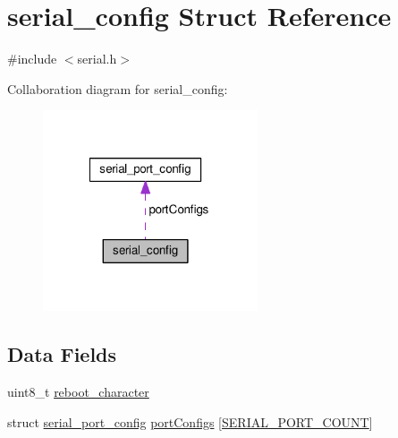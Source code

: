 \hypertarget{structserial__config}{\section{serial\+\_\+config Struct Reference}
\label{structserial__config}
}


{\ttfamily \#include $<$serial.\+h$>$}



Collaboration diagram for serial\+\_\+config\+:\nopagebreak
\begin{figure}[H]
\begin{center}
\leavevmode
\includegraphics[width=180pt]{structserial__config__coll__graph}
\end{center}
\end{figure}
\subsection*{Data Fields}
\begin{DoxyCompactItemize}
\item 
uint8\+\_\+t \hyperlink{structserial__config_a15086bf33d55fea46273d4f761f9dffb}{reboot\+\_\+character}
\item 
struct \hyperlink{structserial__port__config}{serial\+\_\+port\+\_\+config} \hyperlink{structserial__config_a63f189e92594c1d9b5e88f21b238e20e}{port\+Configs} \mbox{[}\hyperlink{test_2unit_2target_8h_af040928dacfd97611f1283a6246bfce2}{S\+E\+R\+I\+A\+L\+\_\+\+P\+O\+R\+T\+\_\+\+C\+O\+U\+N\+T}\mbox{]}
\end{DoxyCompactItemize}


